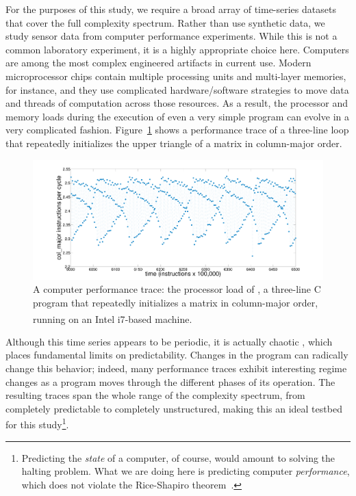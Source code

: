 For the purposes of this study, we require a broad array of
time-series datasets that cover the full complexity spectrum.  Rather
than use synthetic data, we study sensor data from computer
performance experiments.  While this is not a common laboratory
experiment, it is a highly appropriate choice here.  Computers are
among the most complex engineered artifacts in current use.  Modern
microprocessor chips contain multiple processing units and multi-layer
memories, for instance, and they use complicated hardware/software
strategies to move data and threads of computation across those
resources.  As a result, the processor and memory loads during the
execution of even a very simple program can evolve in a very
complicated fashion.  Figure~\ref{fig:col-ipc} shows a performance trace
of a three-line loop that repeatedly initializes the upper triangle of
a matrix in column-major order.
%
 \begin{figure}[htbp]
    \centering
    \includegraphics[width=\columnwidth]{figs/colshortts}
    \caption{A computer performance trace: the processor load of \col,
      a three-line C program that repeatedly initializes a matrix in
      column-major order, running on an Intel
      i7\textsuperscript{\textregistered}-based machine.}
   \label{fig:col-ipc}
  \end{figure}
%
Although this time series appears to be periodic, it is actually
chaotic \cite{mytkowicz09}, which places fundamental limits on
predictability.  Changes in the program can radically change this
behavior; indeed, many performance traces exhibit interesting regime
changes as a program moves through the different phases of its
operation.  The resulting traces span the whole range of the
complexity spectrum, from completely predictable to completely
unstructured, making this an ideal testbed for this
study\footnote{Predicting the \emph{state} of a computer, of course,
  would amount to solving the halting problem.  What we are doing here
  is predicting computer \emph{performance}, which does not violate the
  Rice-Shapiro theorem~\cite{hopcroft2007}.}.


